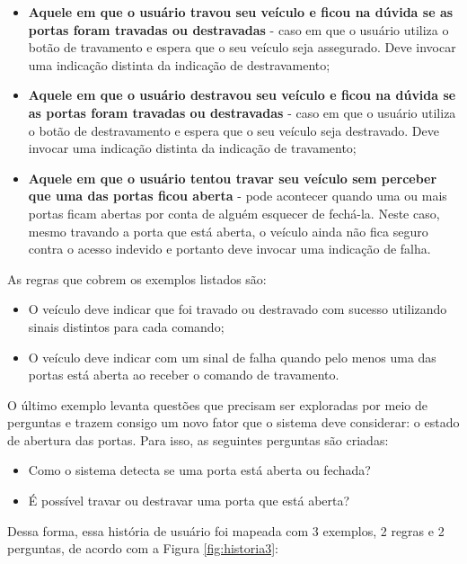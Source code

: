 \begin{itemize}
    \item \textbf{Aquele em que o usuário travou seu veículo e ficou na dúvida se as portas foram travadas ou destravadas} - caso em que o usuário utiliza o botão de travamento e espera que o seu veículo seja assegurado. Deve invocar uma indicação distinta da indicação de destravamento;
    \item \textbf{Aquele em que o usuário destravou seu veículo e ficou na dúvida se as portas foram travadas ou destravadas} - caso em que o usuário utiliza o botão de destravamento e espera que o seu veículo seja destravado. Deve invocar uma indicação distinta da indicação de travamento;
    \item \textbf{Aquele em que o usuário tentou travar seu veículo sem perceber que uma das portas ficou aberta} - pode acontecer quando uma ou mais portas ficam abertas por conta de alguém esquecer de fechá-la. Neste caso, mesmo travando a porta que está aberta, o veículo ainda não fica seguro contra o acesso indevido e portanto deve invocar uma indicação de falha.
\end{itemize} 

As regras que cobrem os exemplos listados são:

\begin{itemize}
    \item O veículo deve indicar que foi travado ou destravado com sucesso utilizando sinais distintos para cada comando;
    \item O veículo deve indicar com um sinal de falha quando pelo menos uma das portas está aberta ao receber o comando de travamento.
\end{itemize}

O último exemplo levanta questões que precisam ser exploradas por meio de perguntas e trazem consigo um novo fator que o sistema deve considerar: o estado de 
abertura das portas. Para isso, as seguintes perguntas são criadas:

\begin{itemize}
    \item Como o sistema detecta se uma porta está aberta ou fechada?
    \item É possível travar ou destravar uma porta que está aberta?
\end{itemize}

Dessa forma, essa história de usuário foi mapeada com 3 exemplos, 2 regras e 2 perguntas, de acordo com a Figura \ref{fig:historia3}:

